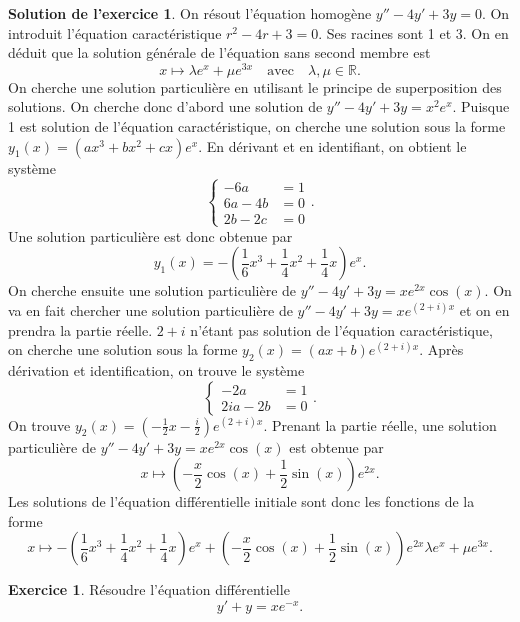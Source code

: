 \documentclass[a4paper, 11pt,openany]{article}%
\theoremstyle{plain}
\theoremstyle{definition}
\newtheorem{exo}{Exercice}
\newtheorem{sol}{Solution de l'exercice}
\theoremstyle{remark}
\newcommand{\R}{\mathbb{R}}
\begin{document}
\begin{sol}
On résout l'équation homogène $y''-4y'+3y=0$. On introduit l'équation caractéristique $r^2-4r+3=0$. Ses racines sont 1 et 3. On en déduit que la solution générale de l'équation sans second membre est 
\[ x \mapsto \lambda e^x + \mu e^{3x} \quad \text{avec} \quad \lambda, \mu \in \R.\]
On cherche une solution particulière en utilisant le principe de superposition des solutions. On cherche donc d'abord une solution de $y''-4y'+3y=x^2e^x$. Puisque 1 est solution de l'équation caractéristique, on cherche une solution sous la forme $y_1(x)=(ax^3+bx^2+cx)e^x$. En dérivant et en identifiant, on obtient le système
$$\begin{cases}-6a&=1\\6a - 4b&=0\\ 2b - 2c &= 0
\end{cases}.$$
Une solution particulière est donc obtenue par \[y_1(x)=- \left( \frac{1}{6} x^3+\frac{1}{4} x^2+ \frac{1}{4} x \right) e^x.\]
On cherche ensuite une solution particulière de $y''-4y'+3y=xe^{2x}\cos(x)$. On va en fait chercher une solution particulière de $y''-4y'+3y=xe^{(2+i)x}$ et on en prendra la partie réelle. $2+i$ n'étant pas solution de l'équation caractéristique, on cherche une solution sous la forme $y_2(x)=(ax+b)e^{(2+i)x}$. Après dérivation et identification, on trouve le système 
$$\begin{cases}-2a&=1\\2ia - 2b&=0
\end{cases}.$$
On trouve $y_2(x)= \left(- \frac{1}{2}x - \frac{i}{2} \right)e^{(2+i)x}$. Prenant la partie réelle, une solution particulière de $y''-4y'+3y=xe^{2x} \cos(x)$ est obtenue par 
\[ x \mapsto \left( -\frac{x}{2} \cos(x)+\frac{1}{2} \sin(x)\right)e^{2x}.\]
Les solutions de l'équation différentielle initiale sont donc les fonctions de la forme
\[ x \mapsto - \left( \frac{1}{6} x^3+\frac{1}{4} x^2+ \frac{1}{4} x \right) e^x + \left( -\frac{x}{2} \cos(x)+\frac{1}{2} \sin(x)\right)e^{2x}  \lambda e^x + \mu e^{3x} .\]
\end{sol}





\begin{exo}
Résoudre l'équation différentielle
\[ y'+y = xe^{-x}.\]
\end{exo}
\end{document}
